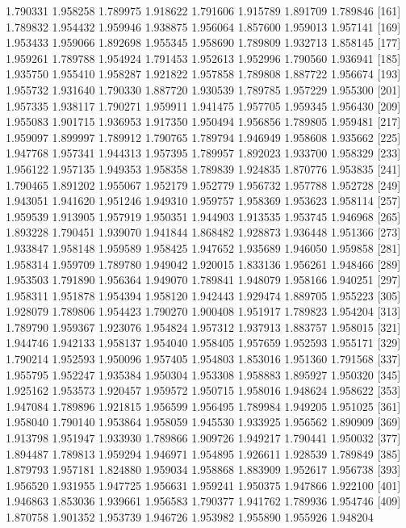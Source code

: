 \documentclass{article}
\begin{document}
\begin{Schunk}
\begin{Soutput}
 [153] 1.790331 1.958258 1.789975 1.918622 1.791606 1.915789 1.891709 1.789846
 [161] 1.789832 1.954432 1.959946 1.938875 1.956064 1.857600 1.959013 1.957141
 [169] 1.953433 1.959066 1.892698 1.955345 1.958690 1.789809 1.932713 1.858145
 [177] 1.959261 1.789788 1.954924 1.791453 1.952613 1.952996 1.790560 1.936941
 [185] 1.935750 1.955410 1.958287 1.921822 1.957858 1.789808 1.887722 1.956674
 [193] 1.955732 1.931640 1.790330 1.887720 1.930539 1.789785 1.957229 1.955300
 [201] 1.957335 1.938117 1.790271 1.959911 1.941475 1.957705 1.959345 1.956430
 [209] 1.955083 1.901715 1.936953 1.917350 1.950494 1.956856 1.789805 1.959481
 [217] 1.959097 1.899997 1.789912 1.790765 1.789794 1.946949 1.958608 1.935662
 [225] 1.947768 1.957341 1.944313 1.957395 1.789957 1.892023 1.933700 1.958329
 [233] 1.956122 1.957135 1.949353 1.958358 1.789839 1.924835 1.870776 1.953835
 [241] 1.790465 1.891202 1.955067 1.952179 1.952779 1.956732 1.957788 1.952728
 [249] 1.943051 1.941620 1.951246 1.949310 1.959757 1.958369 1.953623 1.958114
 [257] 1.959539 1.913905 1.957919 1.950351 1.944903 1.913535 1.953745 1.946968
 [265] 1.893228 1.790451 1.939070 1.941844 1.868482 1.928873 1.936448 1.951366
 [273] 1.933847 1.958148 1.959589 1.958425 1.947652 1.935689 1.946050 1.959858
 [281] 1.958314 1.959709 1.789780 1.949042 1.920015 1.833136 1.956261 1.948466
 [289] 1.953503 1.791890 1.956364 1.949070 1.789841 1.948079 1.958166 1.940251
 [297] 1.958311 1.951878 1.954394 1.958120 1.942443 1.929474 1.889705 1.955223
 [305] 1.928079 1.789806 1.954423 1.790270 1.900408 1.951917 1.789823 1.954204
 [313] 1.789790 1.959367 1.923076 1.954824 1.957312 1.937913 1.883757 1.958015
 [321] 1.944746 1.942133 1.958137 1.954040 1.958405 1.957659 1.952593 1.955171
 [329] 1.790214 1.952593 1.950096 1.957405 1.954803 1.853016 1.951360 1.791568
 [337] 1.955795 1.952247 1.935384 1.950304 1.953308 1.958883 1.895927 1.950320
 [345] 1.925162 1.953573 1.920457 1.959572 1.950715 1.958016 1.948624 1.958622
 [353] 1.947084 1.789896 1.921815 1.956599 1.956495 1.789984 1.949205 1.951025
 [361] 1.958040 1.790140 1.953864 1.958059 1.945530 1.933925 1.956562 1.890909
 [369] 1.913798 1.951947 1.933930 1.789866 1.909726 1.949217 1.790441 1.950032
 [377] 1.894487 1.789813 1.959294 1.946971 1.954895 1.926611 1.928539 1.789849
 [385] 1.879793 1.957181 1.824880 1.959034 1.958868 1.883909 1.952617 1.956738
 [393] 1.956520 1.931955 1.947725 1.956631 1.959241 1.950375 1.947866 1.922100
 [401] 1.946863 1.853036 1.939661 1.956583 1.790377 1.941762 1.789936 1.954746
 [409] 1.870758 1.901352 1.953739 1.946726 1.953982 1.955890 1.955926 1.948204

\end{Soutput}
\end{Schunk}
\end{document}
